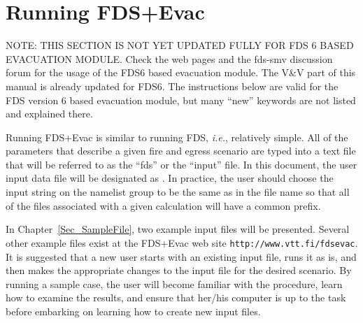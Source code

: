 \documentclass[12pt,a4paper,final,twoside]{stylevk}
\begin{document}
\begin{enumerate}

%
\end{enumerate}
%

\clearpage

\newpage


\chapter{Running FDS+Evac}\label{Sec_Running}

\noindent NOTE: THIS SECTION IS NOT YET UPDATED FULLY FOR FDS 6 BASED
EVACUATION MODULE. Check the web pages and the fds-smv discussion
forum for the usage of the FDS6 based evacuation module. The V\&V part
of this manual is already updated for FDS6.  The instructions below
are valid for the FDS version 6 based evacuation module, but many
``new'' keywords are not listed and explained there.

\noindent Running FDS+Evac is similar to running FDS, \emph{i.e.},
relatively simple.  All of the parameters that describe a given fire
and egress scenario are typed into a text file that will be referred
to as the ``fds'' or the ``input'' file.  In this document, the user
input data file will be designated as .  In practice,
the user should choose the input string  on the
 namelist group to be the same as in the file name so that
all of the files associated with a given calculation will have a
common prefix.


In Chapter~\ref{Sec_SampleFile}, two example input files will be
presented.  Several other example files exist at the FDS+Evac web site
\verb+http://www.vtt.fi/fdsevac+.  It is suggested that a new user
starts with an existing input file, runs it as is, and then makes the
appropriate changes to the input file for the desired scenario.  By
running a sample case, the user will become familiar with the
procedure, learn how to examine the results, and ensure that her/his
computer is up to the task before embarking on learning how to create
new input files.
\end{document}
